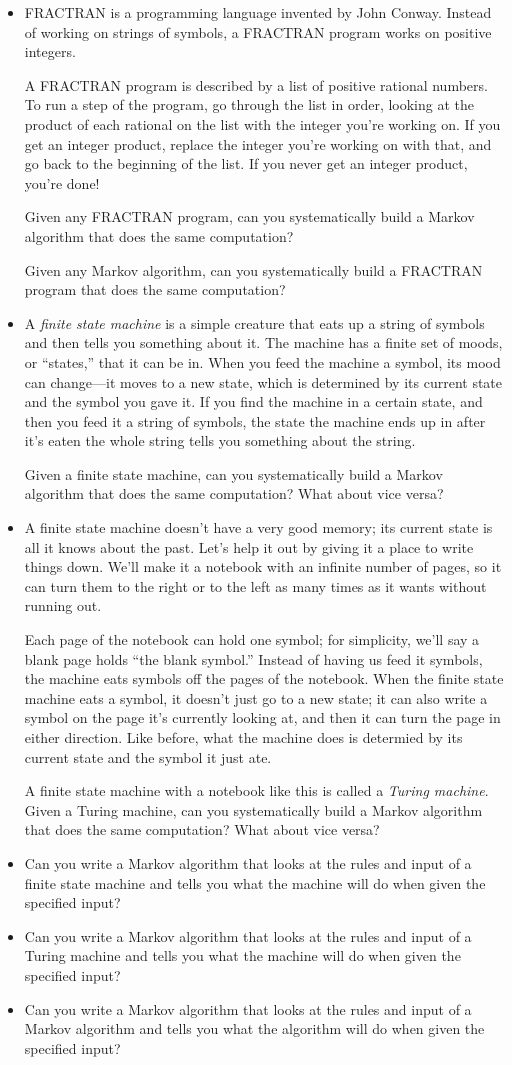 \documentclass{article}
\newcommand*\proveit{\item[\manimpossiblecube]}
\begin{document}
\begin{itemize}
\proveit FRACTRAN is a programming language invented by John Conway. Instead of working on strings of symbols, a FRACTRAN program works on positive integers.

A FRACTRAN program is described by a list of positive rational numbers. To run a step of the program, go through the list in order, looking at the product of each rational on the list with the integer you're working on. If you get an integer product, replace the integer you're working on with that, and go back to the beginning of the list. If you never get an integer product, you're done!

Given any FRACTRAN program, can you systematically build a Markov algorithm that does the same computation?

Given any Markov algorithm, can you systematically build a FRACTRAN program that does the same computation?
\proveit
A {\em finite state machine} is a simple creature that eats up a string of symbols and then tells you something about it. The machine has a finite set of moods, or ``states,'' that it can be in. When you feed the machine a symbol, its mood can change---it moves to a new state, which is determined by its current state and the symbol you gave it. If you find the machine in a certain state, and then you feed it a string of symbols, the state the machine ends up in after it's eaten the whole string tells you something about the string.

Given a finite state machine, can you systematically build a Markov algorithm that does the same computation? What about vice versa?
\proveit
A finite state machine doesn't have a very good memory; its current state is all it knows about the past. Let's help it out by giving it a place to write things down. We'll make it a notebook with an infinite number of pages, so it can turn them to the right or to the left as many times as it wants without running out. 

Each page of the notebook can hold one symbol; for simplicity, we'll say a blank page holds ``the blank symbol.'' Instead of having us feed it symbols, the machine eats symbols off the pages of the notebook. When the finite state machine eats a symbol, it doesn't just go to a new state; it can also write a symbol on the page it's currently looking at, and then it can turn the page in either direction. Like before, what the machine does is determied by its current state and the symbol it just ate.

A finite state machine with a notebook like this is called a {\em Turing machine}. Given a Turing machine, can you systematically build a Markov algorithm that does the same computation? What about vice versa?
\proveit Can you write a Markov algorithm that looks at the rules and input of a finite state machine and tells you what the machine will do when given the specified input?
\proveit Can you write a Markov algorithm that looks at the rules and input of a Turing machine and tells you what the machine will do when given the specified input?
\proveit Can you write a Markov algorithm that looks at the rules and input of a Markov algorithm and tells you what the algorithm will do when given the specified input?
\end{itemize}
\end{document}
